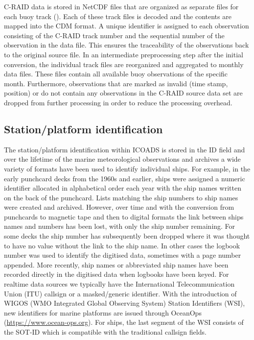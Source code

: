 {\FloatBarrier

C-RAID data is stored in NetCDF files that are organized as separate files for each buoy track (\cite{craidNetCDFManual}).
Each of these track files is decoded and the contents are mapped into the CDM format. 
A unique identifier is assigned to each observation consisting of the C-RAID track number and the sequential number of the observation in the data file.
This ensures the traceability of the observations back to the original source file.
In an intermediate preprocessing step after the initial conversion, the individual track files are reorganized and aggregated to monthly data files.
These files contain all available buoy observations of the specific month.
Furthermore, observations that are marked as invalid (time stamp, position) or do not contain any observations in the C-RAID source data set are dropped from further processing in order to reduce the processing overhead.


\subsection{Station/platform identification}
The station/platform identification within ICOADS is stored in the ID field and over the lifetime of the marine meteorological observations and archives a wide variety of formats have been used to identify individual ships. 
For example, in the early punchcard decks from the 1960s and earlier, ships were assigned a numeric identifier allocated in alphabetical order each year with the ship names written on the back of the punchcard. Lists matching the ship numbers to ship names were created and archived. 
However, over time and with the conversion from punchcards to magnetic tape and then to digital formats the link between ships names and numbers has been lost, with only the ship number remaining.
For some decks the ship number has subsequently been dropped where it was thought to have no value without the link to the ship name.
In other cases the logbook number was used to identify the digitised data, sometimes with a page number appended.
More recently, ship names or abbreviated ship names have been recorded directly in the digitised data when logbooks have been keyed.
For realtime data sources we typically have the International Telecommunication Union (ITU) callsign or a masked/generic identifier.
With the introduction of WIGOS (WMO Integrated Global Observing System) Station Identifiers (WSI), new identifiers for marine platforms are issued through OceanOps (\url{https://www.ocean-ops.org}).
For ships, the last segment of the WSI consists of the SOT-ID which is compatible with the traditional callsign fields.

}
